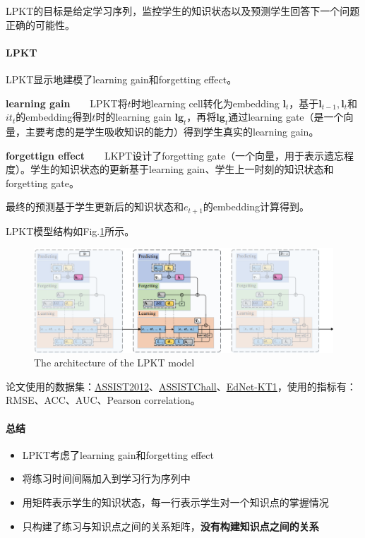 LPKT的目标是给定学习序列，监控学生的知识状态以及预测学生回答下一个问题正确的可能性。

\paragraph{LPKT}
LPKT显示地建模了learning gain和forgetting effect。
\par{\textbf{learning gain}}\ \ \ \ LPKT将$t$时地learning cell转化为embedding $\boldsymbol{l}_t$，基于$\boldsymbol{l}_{t-1}, \boldsymbol{l}_t$和$it_t$的embedding得到$t$时的learning gain $\boldsymbol{lg}_t$，再将$\boldsymbol{lg}_t$通过learning gate（是一个向量，主要考虑的是学生吸收知识的能力）得到学生真实的learning gain。

\par{\textbf{forgettign effect}}\ \ \ \ LKPT设计了forgetting gate（一个向量，用于表示遗忘程度）。学生的知识状态的更新基于learning gain、学生上一时刻的知识状态和forgetting gate。

最终的预测基于学生更新后的知识状态和$e_{t+1}$的embedding计算得到。

LPKT模型结构如Fig.\ref{fig:lpkt}所示。
\begin{figure}[h]
	\centering
	\includegraphics[width=\textwidth]{pics/lpkt.png}
	\caption{The architecture of the LPKT model}
	\label{fig:lpkt}
\end{figure}

论文使用的数据集：\href{https://sites.google.com/site/assistmentsdata/home/2012-13-school-data-withaffect}{ASSIST2012}、\href{https://sites.google.com/view/assistmentsdatamining/dataset}{ASSISTChall}、\href{http://ednet-leaderboard.s3-website-ap-northeast-1.amazonaws.com/}{EdNet-KT1}，使用的指标有：RMSE、ACC、AUC、Pearson correlation。

\paragraph{总结}

\begin{itemize}
	\item LPKT考虑了learning gain和forgetting effect
	\item 将练习时间间隔加入到学习行为序列中
	\item 用矩阵表示学生的知识状态，每一行表示学生对一个知识点的掌握情况
	\item 只构建了练习与知识点之间的关系矩阵，\textbf{没有构建知识点之间的关系}
	
\end{itemize}

